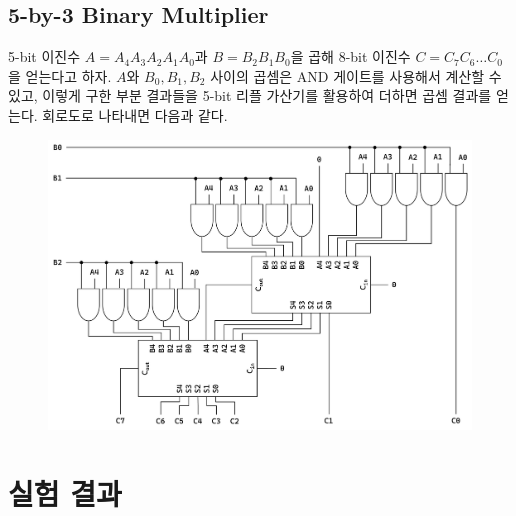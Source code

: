 \documentclass{scrartcl}
\begin{document}
\subsection{5-by-3 Binary Multiplier}
5-bit 이진수 \(A = A_4 A_3 A_2 A_1 A_0\)과 \(B = B_2 B_1 B_0\)을 곱해 8-bit 이진수 \(C = C_7 C_6 \dots C_0\)을 얻는다고 하자.
\(A\)와 \(B_0, B_1, B_2\) 사이의 곱셈은 AND 게이트를 사용해서 계산할 수 있고, 이렇게 구한 부분 결과들을 5-bit 리플 가산기를 활용하여 더하면 곱셈 결과를 얻는다.
회로도로 나타내면 다음과 같다.
\begin{figure}[H]
  \centering
  \includegraphics[width=0.9\linewidth]{multiplier.png}
\end{figure}

\section{실험 결과}
\end{document}
